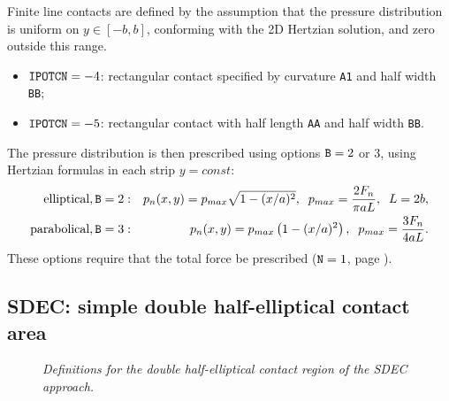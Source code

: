 \documentclass[12pt]{report}
\begin{document}
Finite line contacts are defined by the assumption that the pressure
distribution is uniform on $y\in[-b,b]$, conforming with the
2D Hertzian solution, and zero outside this range.
\begin{itemize}
\item ${\tt IPOTCN}=-4$: rectangular contact specified by curvature
        {\tt A1} and half width {\tt BB};
\item ${\tt IPOTCN}=-5$: rectangular contact with half length {\tt AA} and
        half width {\tt BB}.
\end{itemize}
The pressure distribution is then prescribed using options ${\tt B}=2$ or 3,
using Hertzian formulas in each strip $y=const$:
\begin{eqnarray}
 \mbox{elliptical}, {\tt B}=2  &:& 
                p_n(x,y) = p_{max} \sqrt{ 1 - (x/a)^2 },
        \;\; p_{max} = \frac{2F_n}{\pi aL}, \;\; L=2b, \\
 \mbox{parabolical}, {\tt B}=3 &:& 
                p_n(x,y) = p_{max} \left( 1 - (x/a)^2 \right),
        \;\; p_{max} = \frac{3F_n}{4aL} .
\end{eqnarray}
These options require that the total force be prescribed (${\tt N}=1$,
page \pageref{n3-digit}).

\subsection{SDEC: simple double half-elliptical contact area}
\label{sec:sdec}

\begin{figure}[bt]
\centering
{}
\caption{\em Definitions for the double half-elliptical contact region of
        the SDEC approach.}
\label{fig:sdec_schema}
\end{figure}
\end{document}
